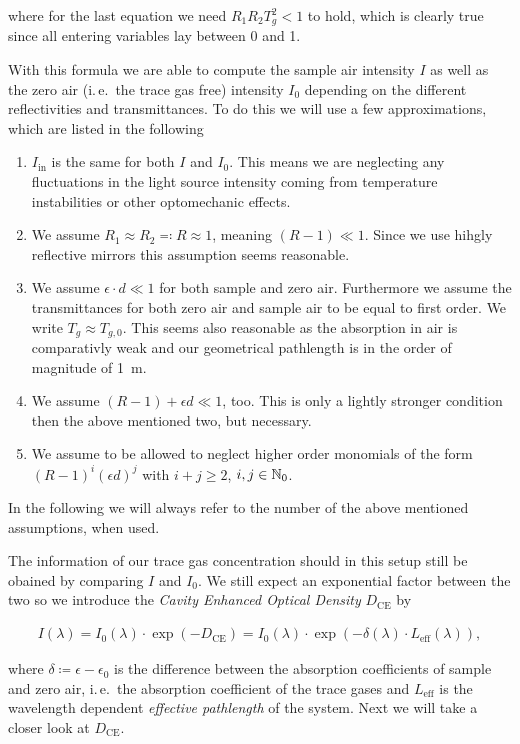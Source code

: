 where for the last equation we need $R_1R_2T_g^2 < 1$ to hold, which
is clearly true since all entering variables lay between 0 and 1.

With this formula we are able to compute the sample air intensity $I$
as well as the zero air (i.\,e.\ the trace gas free) intensity $I_0$
depending on the different reflectivities and transmittances. To do
this we will use a few approximations, which are listed in the
following

\begin{enumerate}
\item $I_{\text{in}}$ is the same for both $I$ and $I_0$. This means
  we are neglecting any fluctuations in the light source intensity
  coming from temperature instabilities or other optomechanic effects.
\item We assume $R_1 \approx R_2 \eqqcolon R \approx 1$, meaning $(R -
  1) \ll 1$. Since we use hihgly reflective mirrors this assumption
  seems reasonable.
\item We assume $\epsilon \cdot d \ll 1$ for both sample and zero
  air. Furthermore we assume the transmittances for both zero air and
  sample air to be equal to first order. We write $T_g \approx
  T_{g,0}$. This seems also reasonable as the absorption in air is
  comparativly weak and our geometrical pathlength is in the order of
  magnitude of \SI{1}{\meter}.
\item We assume  $(R - 1) + \epsilon d \ll 1$, too. This is only a
  lightly stronger condition then the above mentioned two, but
  necessary. 
\item We assume to be allowed to neglect higher order monomials of the
  form $(R-1)^i(\epsilon d)^j$  with $i+j \geq 2$, $i,j \in \mathbb{N}_0$.
\end{enumerate}

In the following we will always refer to the number of the above
mentioned assumptions, when used.

The information of our trace gas concentration should in this setup
still be obained by comparing $I$ and $I_0$. We still expect an
exponential factor between the two so we introduce the \emph{Cavity
  Enhanced Optical Density} $D_{\text{CE}}$ by

\begin{align}
  I(\lambda) = I_0(\lambda) \cdot \exp(- D_{\text{CE}}) = I_0(\lambda)
  \cdot \exp(-\delta(\lambda) \cdot L_{\text{eff}}(\lambda)),
\end{align}

where $\delta \coloneqq \epsilon - \epsilon_0$ is the difference
between the absorption coefficients of sample and zero air, i.\,e.\ the
absorption coefficient of the trace gases and $L_{\text{eff}}$ is the
wavelength dependent \emph{effective pathlength} of the system. Next
we will take a closer look at $D_{\text{CE}}$.

